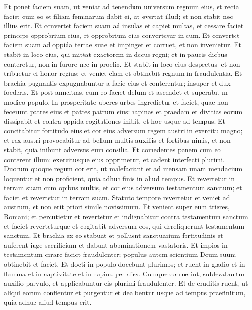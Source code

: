 \begin{biblechapter}
\verse Et ponet faciem suam, ut veniat ad tenendum universum regnum eius, et recta faciet cum eo et filiam feminarum dabit ei, ut evertat illud; et non stabit nec illius erit. 
\verse Et convertet faciem suam ad insulas et capiet multas, et cessare faciet princeps opprobrium eius, et opprobrium eius convertetur in eum. 
\verse Et convertet faciem suam ad oppida terrae suae et impinget et corruet, et non invenietur. 
\verse Et stabit in loco eius, qui mittat exactorem in decus regni; et in paucis diebus conteretur, non in furore nec in proelio. 
\verse Et stabit in loco eius despectus, et non tribuetur ei honor regius; et veniet clam et obtinebit regnum in fraudulentia. 
\verse Et brachia pugnantis expugnabuntur a facie eius et conterentur; insuper et dux foederis. 
\verse Et post amicitias, cum eo faciet dolum et ascendet et superabit in modico populo.  
\verse In prosperitate uberes urbes ingredietur et faciet, quae non fecerunt patres eius et patres patrum eius: rapinas et praedam et divitias eorum dissipabit et contra oppida cogitationes inibit, et hoc usque ad tempus. 
\verse Et concitabitur fortitudo eius et cor eius adversum regem austri in exercitu magno; et rex austri provocabitur ad bellum multis auxiliis et fortibus nimis, et non stabit, quia inibunt adversus eum consilia. 
\verse Et comedentes panem cum eo conterent illum; exercitusque eius opprimetur, et cadent interfecti plurimi.  
\verse Duorum quoque regum cor erit, ut malefaciant et ad mensam unam mendacium loquentur et non proficient, quia adhuc finis in aliud tempus. 
\verse Et revertetur in terram suam cum opibus multis, et cor eius adversum testamentum sanctum; et faciet et revertetur in terram suam. 
\verse Statuto tempore revertetur et veniet ad austrum, et non erit priori simile novissimum. 
\verse Et venient super eum trieres, Romani; et percutietur et revertetur et indignabitur contra testamentum sanctum et faciet reverteturque et cogitabit adversum eos, qui dereliquerunt testamentum sanctum. 
\verse Et brachia ex eo stabunt et polluent sanctuarium fortitudinis et auferent iuge sacrificium et dabunt abominationem vastatoris. 
\verse Et impios in testamentum errare faciet fraudulenter; populus autem scientium Deum suum obtinebit et faciet. 
\verse Et docti in populo docebunt plurimos; et ruent in gladio et in flamma et in captivitate et in rapina per dies. 
\verse Cumque corruerint, sublevabuntur auxilio parvulo, et applicabuntur eis plurimi fraudulenter. 
\verse Et de eruditis ruent, ut aliqui eorum conflentur et purgentur et dealbentur usque ad tempus praefinitum, quia adhuc aliud tempus erit. 

\end{biblechapter}
